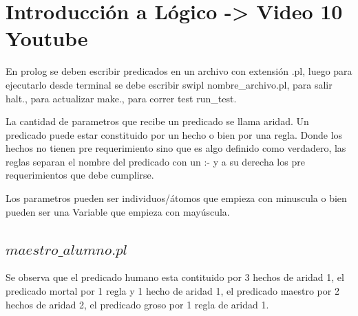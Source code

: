 \documentclass[11pt,a4paper]{article}
\begin{document}
\pagestyle{fancy}
\lhead{\sc }
\chead{}
\rhead{\rightmark}
\lfoot{}
\cfoot{}
\rfoot{\thepage}

%




\newpage

\section{Introducción a Lógico -> Video 10 Youtube}

En prolog se deben escribir predicados en un archivo con extensión .pl, luego para ejecutarlo desde terminal se debe escribir swipl nombre\_archivo.pl, para salir halt., para actualizar make., para correr test run\_test.

La cantidad de parametros que recibe un predicado se llama aridad. Un predicado puede estar constituido por un hecho o bien por una regla. Donde los hechos no tienen pre requerimiento sino que es algo definido como verdadero, las reglas separan el nombre del predicado con un :- y a su derecha los pre requerimientos que debe cumplirse.

Los parametros pueden ser individuos/átomos que empieza con minuscula o bien pueden ser una Variable que empieza con mayúscula.

\subsection{$maestro\_alumno.pl$}
 

Se observa que el predicado humano esta contituido por 3 hechos de aridad 1, el predicado mortal por 1 regla y 1 hecho de aridad 1, el predicado maestro por 2 hechos de aridad 2, el predicado groso por 1 regla de aridad 1.
\end{document}
